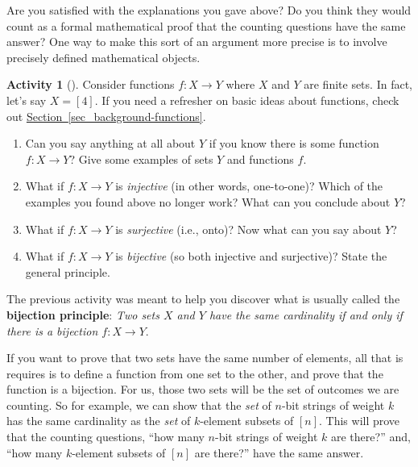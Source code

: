\documentclass[10pt,]{book}
\newcommand{\terminology}[1]{\textbf{#1}}
\theoremstyle{plain}
\theoremstyle{definition}
\theoremstyle{definition}
\theoremstyle{definition}
\newtheorem{activity}[project]{Activity}
\numberwithin{equation}{chapter}
\begin{document}
\hypertarget{p-511}{}%
Are you satisfied with the explanations you gave above?  Do you think they would count as a formal mathematical proof that the counting questions have the same answer?  One way to make this sort of an argument more precise is to involve precisely defined mathematical objects.%
\begin{activity}[]\label{activity-62}
\hypertarget{p-512}{}%
Consider functions \(f:X \to Y\) where \(X\) and \(Y\) are finite sets.  In fact, let's say \(X = [4]\). If you need a refresher on basic ideas about functions, check out \hyperref[sec_background-functions]{Section~\ref{sec_background-functions}}.%
\begin{enumerate}[font=\bfseries,label=(\alph*),ref=\alph*]
\item\label{task-91} \hypertarget{p-513}{}%
Can you say anything at all about \(Y\) if you know there is some function \(f:X \to Y\)?  Give some examples of sets \(Y\) and functions \(f\).%
\item\label{task-92} \hypertarget{p-514}{}%
What if \(f:X \to Y\) is \emph{injective} (in other words, one-to-one)?  Which of the examples you found above no longer work?  What can you conclude about \(Y\)?%
\item\label{task-93} \hypertarget{p-515}{}%
What if \(f:X \to Y\) is \emph{surjective} (i.e., onto)?  Now what can you say about \(Y\)?%
\item\label{task-94} \hypertarget{p-516}{}%
What if \(f:X\to Y\) is \emph{bijective} (so both injective and surjective)?  State the general principle.%
\end{enumerate}
\end{activity}
\hypertarget{p-517}{}%
The previous activity was meant to help you discover what is usually called the \terminology{bijection principle}: \emph{Two sets \(X\) and \(Y\) have the same cardinality if and only if there is a bijection \(f:X \to Y\)}.%
\par
\hypertarget{p-518}{}%
If you want to prove that two sets have the same number of elements, all that is requires is to define a function from one set to the other, and prove that the function is a bijection.  For us, those two sets will be the set of outcomes we are counting.  So for example, we can show that the \emph{set} of \(n\)-bit strings of weight \(k\) has the same cardinality as the \emph{set} of \(k\)-element subsets of \([n]\).  This will prove that the counting questions, ``how many \(n\)-bit strings of weight \(k\) are there?'' and, ``how many \(k\)-element subsets of \([n]\) are there?'' have the same answer.%
\end{document}
